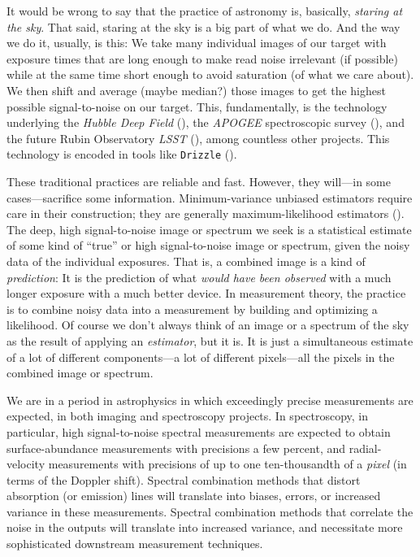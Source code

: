 \documentclass[modern]{aastex631}
\begin{document}
It would be wrong to say that the practice of astronomy is, basically, \emph{staring at the sky}.
That said, staring at the sky is a big part of what we do.
And the way we do it, usually, is this:
We take many individual images of our target with exposure times that are long enough to make read noise irrelevant (if possible) while at the same time short enough to avoid saturation (of what we care about).
We then shift and average (maybe median?) those images to get the highest possible signal-to-noise on our target.
This, fundamentally, is the technology underlying the \textsl{Hubble Deep Field} (\citealt{hdf}),
the \textsl{APOGEE} spectroscopic survey (\citealt{apogee}),
and the future Rubin Observatory \textsl{LSST} (\citealt{lsst}), among countless other projects.
This technology is encoded in tools like \texttt{Drizzle} (\citealt{drizzle}).

These traditional practices are reliable and fast.
However, they will---in some cases---sacrifice some information.
Minimum-variance unbiased estimators require care in their construction; they are generally maximum-likelihood estimators (\citealt{mvue}). %
The deep, high signal-to-noise image or spectrum we seek is a statistical estimate of some kind of ``true'' or high signal-to-noise image or spectrum, given the noisy data of the individual exposures.
That is, a combined image is a kind of \emph{prediction}: It is the prediction of what \emph{would have been observed} with a much longer exposure with a much better device.
In measurement theory, the practice is to combine noisy data into a measurement by building and optimizing a likelihood.
Of course we don't always think of an image or a spectrum of the sky as the result of applying an \emph{estimator}, but it is.
It is just a simultaneous estimate of a lot of different components---a lot of different pixels---all the pixels in the combined image or spectrum.

We are in a period in astrophysics in which exceedingly precise measurements are expected, in both imaging and spectroscopy projects.
In spectroscopy, in particular, high signal-to-noise spectral measurements are expected to obtain surface-abundance measurements with precisions a few percent, and radial-velocity measurements with precisions of up to one ten-thousandth of a \emph{pixel} (in terms of the Doppler shift).
Spectral combination methods that distort absorption (or emission) lines will translate into biases, errors, or increased variance in these measurements.
Spectral combination methods that correlate the noise in the outputs will translate into increased variance, and necessitate more sophisticated downstream measurement techniques.
\end{document}
